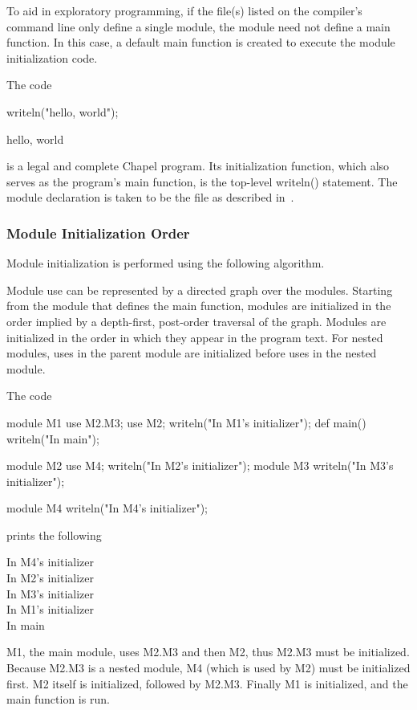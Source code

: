 To aid in exploratory programming, if the file(s) listed on the
compiler's command line only define a single module, the module need
not define a main function.  In this case, a default main function is
created to execute the module initialization code.
\begin{example}
The code
\begin{chapelpre}
\end{chapelpre}
\begin{chapel}
writeln("hello, world");
\end{chapel}
\begin{chapeloutput}
hello, world
\end{chapeloutput}
is a legal and complete Chapel program.  Its initialization function,
which also serves as the program's main function, is the top-level
writeln() statement.  The module declaration is taken to be the file
as described in~.
\end{example}


\subsubsection{Module Initialization Order}
\label{Module_Initialization_Order}

Module initialization is performed using the following algorithm.

Module use can be represented by a directed graph over the modules.
Starting from the module that defines the main function, modules are
initialized in the order implied by a depth-first, post-order
traversal of the graph.  Modules are initialized in the order in which
they appear in the program text.  For nested modules, uses in the
parent module are initialized before uses in the nested module.

\begin{example}
The code
\begin{chapelpre}
\end{chapelpre}
\begin{chapel}
module M1 {
  use M2.M3;
  use M2;
  writeln("In M1's initializer");
  def main() {
    writeln("In main");
  }
}

module M2 {
  use M4;
  writeln("In M2's initializer");
  module M3 {
    writeln("In M3's initializer");
  }
}

module M4 {
  writeln("In M4's initializer");
}
\end{chapel}
prints the following
\begin{chapelprintoutput}
In M4's initializer\\
In M2's initializer\\
In M3's initializer\\
In M1's initializer\\
In main
\end{chapelprintoutput}
M1, the main module, uses M2.M3 and then M2, thus M2.M3 must be
initialized.  Because M2.M3 is a nested module, M4 (which is used by
M2) must be initialized first.  M2 itself is initialized, followed by
M2.M3.  Finally M1 is initialized, and the main function is run.
\end{example}

